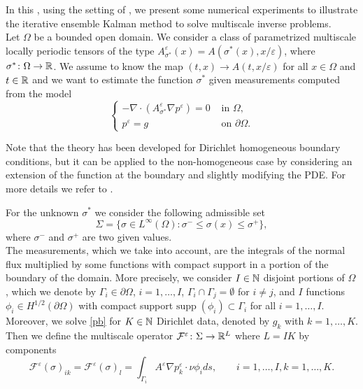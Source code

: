 \documentclass[10pt]{article}
\begin{document}
In this , using the setting of \cite{AbD18}, we present some numerical experiments to illustrate the iterative ensemble Kalman method to solve multiscale inverse problems. \\
Let $\Omega$ be a bounded open domain. We consider a class of parametrized multiscale locally periodic tensors of the type $A^{\varepsilon}_{\sigma^*}(x) = A(\sigma^*(x),x/\varepsilon)$, where $\sigma^* \colon \Omega \to \mathbb{R}$. We assume to know the map $(t,x) \to A(t,x/\varepsilon)$ for all $x \in \Omega$ and $t \in \mathbb{R}$ and we want to estimate the function $\sigma^*$ given measurements computed from the model
\begin{equation}
\label{pb}
\begin{cases}
- \nabla \cdot ( A^{\varepsilon}_{\sigma^*} \nabla p^{\varepsilon} ) = 0 & \text{ in } \Omega, \\
p^{\varepsilon} = g & \text{ on } \partial \Omega.
\end{cases}
\end{equation}
\begin{remark}
Note that the theory has been developed for Dirichlet homogeneous boundary conditions, but it can be applied to the non-homogeneous case by considering an extension of the function at the boundary and slightly modifying the PDE. For more details we refer to \cite[Remark 8.10]{Sal16}.
\end{remark}
For the unknown $\sigma^*$ we consider the following admissible set
\[ \Sigma = \{ \sigma \in L^{\infty}(\Omega) \colon \sigma^- \le \sigma(x) \le \sigma^+ \}, \]
where $\sigma^-$ and $\sigma^+$ are two given values. \\
The measurements, which we take into account, are the integrals of the normal flux multiplied by some functions with compact support in a portion of the boundary of the domain. More precisely, we consider $I \in \mathbb{N}$ disjoint portions of $\Omega$, which we denote by $\Gamma_i \in \partial \Omega$, $i = 1, \dots, I$, $\Gamma_i \cap \Gamma_j = \emptyset$ for $i \neq j$, and $I$ functions $\phi_i \in H^{1/2}(\partial \Omega)$ with compact support $\mathrm{supp} \; (\phi_i) \subset \Gamma_i$ for all $i = 1, \dots, I$. Moreover, we solve \eqref{pb} for $K \in \mathbb{N}$ Dirichlet data, denoted by $g_k$ with $k = 1, \dots, K$. Then we define the multiscale operator $\mathcal{F}^{\varepsilon} \colon \Sigma \to \mathbb{R}^L$ where $L = IK$ by components
\begin{equation}
\label{boundary_integral_e}
\mathcal{F}^{\varepsilon}(\sigma)_{ik} = \mathcal{F}^{\varepsilon}(\sigma)_{l} = \int_{\Gamma_i} A^{\varepsilon} \nabla p_k^{\varepsilon} \cdot \nu \phi_i ds, \qquad i = 1, \dots, I, k = 1, \dots, K.
\end{equation}
\end{document}
